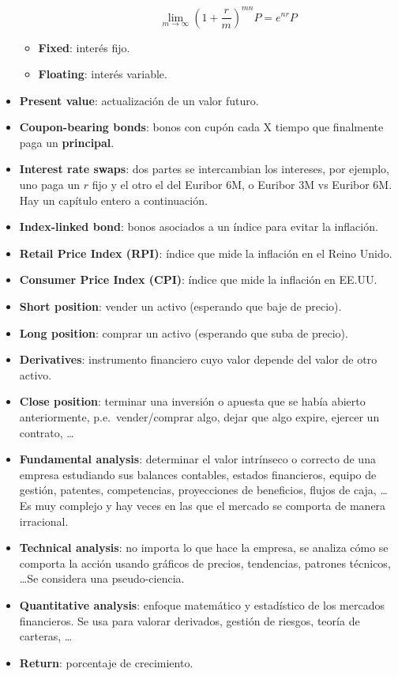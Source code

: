 \begin{itemize}
\begin{itemize}
\begin{itemize}
            \[\lim_{m\rightarrow\infty}\left( 1+\frac{r}{m} \right)^{mn}P=e^{nr}P\]
        \end{itemize}
        \item \textbf{Fixed}: interés fijo.
        \item \textbf{Floating}: interés variable.
    \end{itemize}
    \item \textbf{Present value}: actualización de un valor futuro. 
    \item \textbf{Coupon-bearing bonds}: bonos con cupón cada X tiempo que finalmente paga un \textbf{principal}.
    \item \textbf{Interest rate swaps}: dos partes se intercambian los intereses, por ejemplo, uno paga un $r$ fijo y el otro el del Euribor 6M, o Euribor 3M vs Euribor 6M. Hay un capítulo entero a continuación.
    \item \textbf{Index-linked bond}: bonos asociados a un índice para evitar la inflación.
    \item \textbf{Retail Price Index (RPI)}: índice que mide la inflación en el Reino Unido.
    \item \textbf{Consumer Price Index (CPI)}: índice que mide la inflación en EE.UU.\@
    \item \textbf{Short position}: vender un activo (esperando que baje de precio).
    \item \textbf{Long position}: comprar un activo (esperando que suba de precio).
    \item \textbf{Derivatives}: instrumento financiero cuyo valor depende del valor de otro activo.
    \item \textbf{Close position}: terminar una inversión o apuesta que se había abierto anteriormente, p.e.\ vender/comprar algo, dejar que algo expire, ejercer un contrato, \ldots{}
    \item \textbf{Fundamental analysis}: determinar el valor intrínseco o correcto de una empresa estudiando sus balances contables, estados financieros, equipo de gestión, patentes, competencias, proyecciones de beneficios, flujos de caja, \dots Es muy complejo y hay veces en las que el mercado se comporta de manera irracional.
    \item \textbf{Technical analysis}: no importa lo que hace la empresa, se analiza cómo se comporta la acción usando gráficos de precios, tendencias, patrones técnicos, \dots Se considera una pseudo-ciencia.
    \item \textbf{Quantitative analysis}: enfoque matemático y estadístico de los mercados financieros. Se usa para valorar derivados, gestión de riesgos, teoría de carteras, \dots
    \item \textbf{Return}: porcentaje de crecimiento.
\end{itemize}


